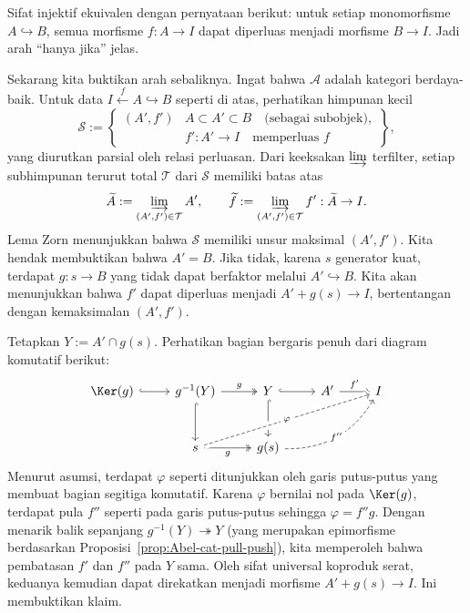 \begin{bukti}
Sifat injektif ekuivalen dengan pernyataan berikut: untuk setiap monomorfisme
$A\hookrightarrow B$, semua morfisme $f:A\to I$ dapat diperluas menjadi
morfisme $B\to I$. Jadi arah ``hanya jika'' jelas.

Sekarang kita buktikan arah sebaliknya. Ingat bahwa $\mathcal{A}$ adalah
kategori berdaya-baik. Untuk data $I\xleftarrow{f}A\hookrightarrow B$ seperti
di atas, perhatikan himpunan kecil
\[\mathcal{S}:=\left\{\begin{array}{r|l}
	(A',f')&A\subset A'\subset B\quad\text{(sebagai subobjek)},\\
	&f':A'\to I\quad\text{memperluas }f
\end{array}\right\},\]
yang diurutkan parsial oleh relasi perluasan. Dari keeksakan $\varinjlim$
terfilter, setiap subhimpunan terurut total $\mathcal{T}$ dari $\mathcal{S}$
memiliki batas atas
\[\widetilde{A}:=\varinjlim_{(A',f')\in\mathcal{T}}A',\qquad
\widetilde{f}:=\varinjlim_{(A',f')\in\mathcal{T}}f':\widetilde{A}\to I.\]
Lema Zorn menunjukkan bahwa $\mathcal{S}$ memiliki unsur maksimal $(A',f')$.
Kita hendak membuktikan bahwa $A'=B$. Jika tidak, karena $s$ generator kuat,
terdapat $g:s\to B$ yang tidak dapat berfaktor melalui $A'\hookrightarrow B$.
Kita akan menunjukkan bahwa $f'$ dapat diperluas menjadi
$A'+g(s)\to I$, bertentangan dengan kemaksimalan $(A',f')$.

Tetapkan $Y:=A'\cap g(s)$. Perhatikan bagian bergaris penuh dari diagram
komutatif berikut:
\[\begin{tikzcd}[row sep=large]
	\Ker(g)\arrow[hookrightarrow,r]&g^{-1}(Y)
	\arrow[twoheadrightarrow,r,"g"]\arrow[hookrightarrow,d]
	&Y\arrow[hookrightarrow,r]\arrow[hookrightarrow,d]
	&A'\arrow[r,"{f'}"]&I\\
	&s\arrow[twoheadrightarrow,r,"g"']
	\arrow[dashed,rrru,crossing over,"\varphi" description]
	&g(s)\arrow[dashed,bend right,rru,"{f''}" description]&&
\end{tikzcd}\]
Menurut asumsi, terdapat $\varphi$ seperti ditunjukkan oleh garis putus-putus
yang membuat bagian segitiga komutatif. Karena $\varphi$ bernilai nol pada
$\Ker(g)$, terdapat pula $f''$ seperti pada garis putus-putus sehingga
$\varphi=f''g$. Dengan menarik balik sepanjang
$g^{-1}(Y)\twoheadrightarrow Y$ (yang merupakan epimorfisme berdasarkan
Proposisi~\ref{prop:Abel-cat-pull-push}), kita memperoleh bahwa pembatasan
$f'$ dan $f''$ pada $Y$ sama. Oleh sifat universal koproduk serat, keduanya
kemudian dapat direkatkan menjadi morfisme $A'+g(s)\to I$. Ini membuktikan
klaim.
\end{bukti}

